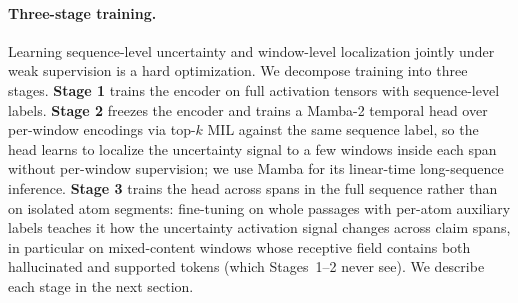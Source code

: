 \paragraph{Three-stage training.} Learning sequence-level uncertainty
and window-level localization jointly under weak supervision is a
hard optimization. We decompose training into three stages.
\textbf{Stage 1} trains the encoder on full activation tensors with
sequence-level labels. \textbf{Stage 2} freezes the encoder and trains a Mamba-2 temporal
head over per-window encodings via top-$k$ MIL against the same
sequence label, so the head learns to localize the uncertainty signal
to a few windows inside each span without per-window supervision; we
use Mamba \citep{albertgu2024} for its linear-time long-sequence
inference.
\textbf{Stage 3} trains the head across spans in the full sequence
rather than on isolated atom segments: fine-tuning on whole passages
with per-atom auxiliary labels teaches it how the uncertainty
activation signal changes across claim spans, in particular on
mixed-content windows whose receptive field contains both hallucinated
and supported tokens (which Stages~1--2 never see). We describe each stage in the next section.
